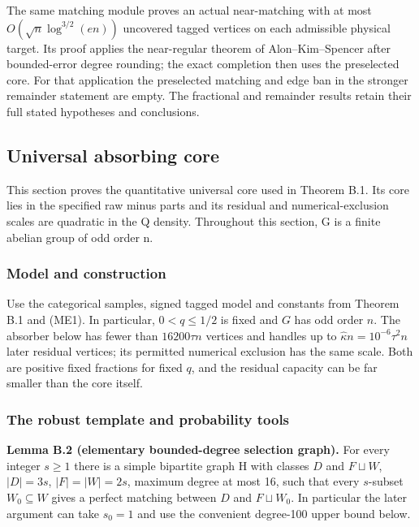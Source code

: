 \documentclass[11pt,a4paper]{article}
\newcommand{\statementstart}{\par\addvspace{6pt plus 1pt minus 1pt}\noindent}
\begin{document}
The same matching module proves an actual near-matching with at most \(O(\sqrt n\log^{3/2}(en))\) uncovered tagged vertices on each admissible physical target. Its proof applies the near-regular theorem of Alon--Kim--Spencer after bounded-error degree rounding; the exact completion then uses the preselected core. For that application the preselected matching and edge ban in the stronger remainder statement are empty. The fractional and remainder results retain their full stated hypotheses and conclusions.

\hypertarget{universal-absorbing-core}{%
\subsection{Universal absorbing core}\label{universal-absorbing-core}}

This section proves the quantitative universal core used in Theorem B.1. Its core lies in the specified raw minus parts and its residual and numerical-exclusion scales are quadratic in the Q density. Throughout this section, G is a finite abelian group of odd order n.

\hypertarget{model-and-construction}{%
\subsubsection{Model and construction}\label{model-and-construction}}

Use the categorical samples, signed tagged model and constants from Theorem B.1 and (ME1). In particular, \(0<q\leq1/2\) is fixed and \(G\) has odd order \(n\). The absorber below has fewer than \(16200\tau n\) vertices and handles up to \(\widehat\kappa n=10^{-6}\tau^2 n\) later residual vertices; its permitted numerical exclusion has the same scale. Both are positive fixed fractions for fixed \(q\), and the residual capacity can be far smaller than the core itself.

\hypertarget{the-robust-template-and-probability-tools}{%
\subsubsection{The robust template and probability tools}\label{the-robust-template-and-probability-tools}}

\statementstart\textbf{Lemma B.2 (elementary bounded-degree selection graph).} For every integer \(s\ge 1\) there is a simple bipartite graph H with classes \(D\) and \(F\sqcup W\), \(|D|=3s\), \(|F|=|W|=2s\), maximum degree at most 16, such that every \(s\)-subset \(W_0\subseteq W\) gives a perfect matching between \(D\) and \(F\sqcup W_0\). In particular the later argument can take \(s_0=1\) and use the convenient degree-100 upper bound below.
\end{document}
